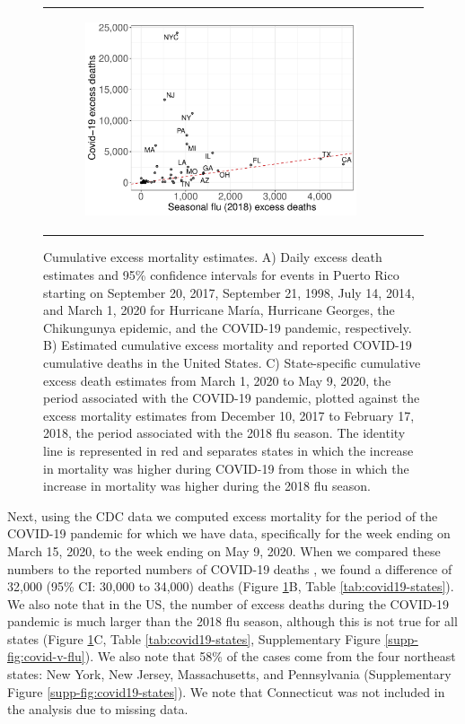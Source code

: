 \documentclass[11pt]{article}
\begin{document}
\begin{figure}[ht]
\begin{tabular}{lll}
\begin{subfigure}[t]{0.3\linewidth}
		\includegraphics[width=1\linewidth]{figs/figure-2c.pdf}
	\end{subfigure}\\
	\end{tabular}
    \caption{Cumulative excess mortality estimates. A) Daily excess death estimates and 95\% confidence intervals for events in Puerto Rico starting on September 20, 2017, September 21, 1998, July 14, 2014, and March 1, 2020 for Hurricane Mar\'ia, Hurricane Georges, the Chikungunya epidemic, and the COVID-19 pandemic, respectively.  B) Estimated cumulative excess mortality and reported COVID-19 cumulative deaths in the United States. C) State-specific cumulative excess death estimates from March 1, 2020 to May 9, 2020, the period associated with the COVID-19 pandemic, plotted against the excess mortality estimates from December 10, 2017 to February 17, 2018, the period associated with the 2018 flu season. The identity line is represented in red and separates states in which the increase in mortality was higher during COVID-19 from those in which the increase in mortality was higher during the 2018 flu season.}
    \label{fig:excess-deaths}
\end{figure}

Next, using the CDC data we computed excess mortality for the period of the COVID-19 pandemic for which we have data, specifically for the week ending on March 15, 2020, to the week ending on May 9, 2020. When we compared these numbers to the reported numbers of COVID-19 deaths \cite{smith2020coronavirus}, we found a difference of 32,000 (95\% CI: 30,000 to 34,000) deaths (Figure \ref{fig:excess-deaths}B, Table \ref{tab:covid19-states}). We also note that in the US, the number of excess deaths during the COVID-19 pandemic is much larger than the 2018 flu season, although this is not true for all states (Figure \ref{fig:excess-deaths}C, Table \ref{tab:covid19-states}, Supplementary Figure \ref{supp-fig:covid-v-flu}). We also note that 58\% of the cases come from the four northeast states: New York, New Jersey, Massachusetts, and Pennsylvania (Supplementary Figure \ref{supp-fig:covid19-states}). We note that Connecticut was not included in the analysis due to missing data.
\end{document}
